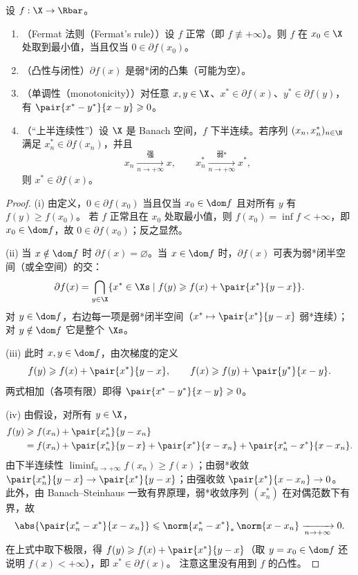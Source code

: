 \begin{proposition}[基本性质]
\label{res:37}
设 $f:\X\to\Rbar$。
\begin{enumerate}[label=(\roman*)]
  \item （Fermat 法则（Fermat's rule））设 $f$ 正常（即 $f\not\equiv+\infty$）。则 $f$ 在 $x_0\in\X$ 处取到最小值，当且仅当 $0\in\partial f(x_0)$。
  \item （凸性与闭性）$\partial f(x)$ 是弱*闭的凸集（可能为空）。
  \item （单调性（monotonicity））对任意 $x,y\in\X$、$x^*\in\partial f(x)$、$y^*\in\partial f(y)$，有 $\pair{x^*-y^*}{x-y}\geqslant0$。
  \item （“上半连续性”）设 $\X$ 是 Banach 空间，$f$ 下半连续。若序列 $(x_n,x_n^*)_{n\in\N}$ 满足 $x_n^*\in\partial f(x_n)$，并且
        \[
          x_n\xrightarrow[n\to+\infty]{\text{强}}x,\qquad x_n^*\xrightarrow[n\to+\infty]{\text{弱*}}x^*,
        \]
        则 $x^*\in\partial f(x)$。
\end{enumerate}
\end{proposition}

\begin{proof}
(i) 由定义，$0\in\partial f(x_0)$ 当且仅当 $x_0\in\dom f$ 且对所有 $y$ 有 $f(y)\geqslant f(x_0)$。
若 $f$ 正常且在 $x_0$ 处取最小值，则 $f(x_0)=\inf f<+\infty$，即 $x_0\in\dom f$，故 $0\in\partial f(x_0)$；反之显然。

(ii) 当 $x\notin\dom f$ 时 $\partial f(x)=\varnothing$。当 $x\in\dom f$ 时，$\partial f(x)$ 可表为弱*闭半空间（或全空间）的交：
\[
  \partial f(x)=\bigcap_{y\in\X}\{x^*\in\Xs\mid f(y)\geqslant f(x)+\pair{x^*}{y-x}\}.
\]
对 $y\in\dom f$，右边每一项是弱*闭半空间（$x^*\mapsto\pair{x^*}{y-x}$ 弱*连续）；对 $y\notin\dom f$ 它是整个 $\Xs$。

(iii) 此时 $x,y\in\dom f$，由次梯度的定义
\[
  f(y)\geqslant f(x)+\pair{x^*}{y-x},\qquad f(x)\geqslant f(y)+\pair{y^*}{x-y}.
\]
两式相加（各项有限）即得 $\pair{x^*-y^*}{x-y}\geqslant0$。

(iv) 由假设，对所有 $y\in\X$，
\begin{align*}
  f(y)&\geqslant f(x_n)+\pair{x_n^*}{y-x_n}\\
      &=f(x_n)+\pair{x_n^*}{y-x}+\pair{x^*}{x-x_n}+\pair{x_n^*-x^*}{x-x_n}.
\end{align*}
由下半连续性 $\liminf_{n\to+\infty}f(x_n)\geqslant f(x)$；由弱*收敛 $\pair{x_n^*}{y-x}\to\pair{x^*}{y-x}$；由强收敛 $\pair{x^*}{x-x_n}\to0$。
此外，由 Banach--Steinhaus 一致有界原理，弱*收敛序列 $(x_n^*)$ 在对偶范数下有界，故
\[
  \abs{\pair{x_n^*-x^*}{x-x_n}}\leqslant\norm{x_n^*-x^*}_*\,\norm{x-x_n}\xrightarrow[n\to+\infty]{}0.
\]
在上式中取下极限，得 $f(y)\geqslant f(x)+\pair{x^*}{y-x}$（取 $y=x_0\in\dom f$ 还说明 $f(x)<+\infty$），即 $x^*\in\partial f(x)$。
注意这里没有用到 $f$ 的凸性。
\end{proof}

